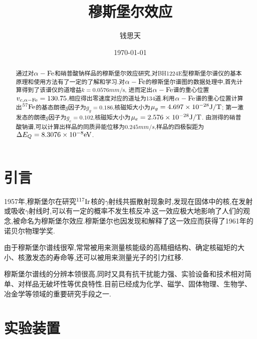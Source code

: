 \documentclass[aps,pre,12pt,preprint,onecolumn,showpacs,showkeys]{revtex4-1}
\begin{document}
\title{\bf\heiti{}穆斯堡尔效应\vspace{15mm}}
\author{\fangsong{}钱思天\vspace{2mm}}
\date{\today}

\begin{abstract}
\vspace{10mm}
\begin{spacing}{1.5}
\songti{}
通过对$\alpha-\rm{Fe}$和硝普酸钠样品的穆斯堡尔效应研究,对BH1224E型穆斯堡尔谱仪的基本原理和使用方法有了一定的了解和学习.对$\alpha-\rm{Fe}$的穆斯堡尔谱图的数据处理中,首先计算得到了该谱仪的道增益$k=\si{\num{0.0576}mm \per \second}$,
进而定出$\alpha-\rm{Fe}$谱的重心位置$v_{c,\alpha-\rm{Fe}}=130.75$,相应得出零速度对应的道址为134道.利用$\alpha-\rm{Fe}$谱的重心位置计算出$^{57}\rm{Fe}$的基态朗德$g$因子为$g_g=0.186$,核磁矩大小为$\mu_g=\si{\num{4.697E-28}J\per T}$;
第一激发态的朗德$g$因子为$g_e=0.102$,核磁矩大小为$\mu_e=\si{\num{2.576E-28 }J\per T}$.
由测得的硝普酸钠谱,可以计算出样品的同质异能位移为$0.245\si{mm\per s}$,样品的四极裂距为$\Delta E_Q=\si{\num{8.3076E-8}eV}$.
\end{spacing}
\end{abstract}
\maketitle
\songti{}

\section{引言}
1957年,穆斯堡尔在研究$^{117}\rm{Ir}$核的$\gamma$射线共振散射现象时,发现在固体中的核,在发射或吸收$\gamma$射线时,可以有一定的概率不发生核反冲.这一效应极大地影响了人们的观念,被命名为穆斯堡尔效应.穆斯堡尔也因发现和解释了这一效应而获得了1961年的诺贝尔物理学奖.
\par
由于穆斯堡尔谱线很窄,常常被用来测量核能级的高精细结构、确定核磁矩的大小、核激发态的寿命等,还可以被用来测量光子的引力红移.
\par
穆斯堡尔谱线的分辨本领很高,同时又具有抗干扰能力强、实验设备和技术相对简单、对样品无破坏性等优良特性.目前已经成为化学、磁学、固体物理、生物学、冶金学等领域的重要研究手段之一.
\section{实验装置}
\end{document}
